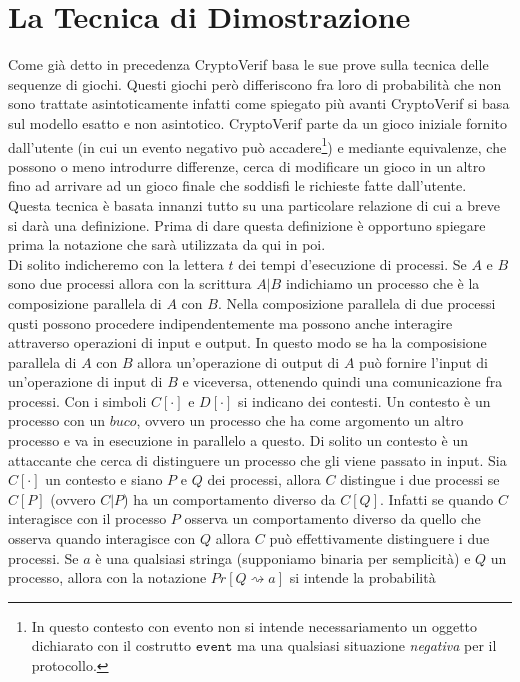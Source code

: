 \documentclass[a4paper,openright,twoside,12pt]{report}
\begin{document}
\section{La Tecnica di Dimostrazione}
Come gi\`a detto in precedenza CryptoVerif basa le sue prove sulla tecnica delle sequenze di giochi. Questi giochi per\`o differiscono fra loro
di probabilit\`a che non sono trattate asintoticamente infatti come spiegato pi\`u avanti CryptoVerif si basa sul modello esatto e non asintotico.
CryptoVerif parte da un gioco iniziale fornito dall'utente 
(in cui un evento negativo pu\`o accadere\footnote{In questo contesto con evento non si intende necessariamento un oggetto 
dichiarato con il costrutto $\texttt{event}$ ma una qualsiasi situazione \emph{negativa} per il protocollo.}) e mediante equivalenze, 
che possono o meno
introdurre differenze, cerca di modificare un gioco in un altro fino ad arrivare ad un gioco finale che soddisfi le richieste fatte dall'utente. Questa tecnica \`e basata innanzi tutto su una 
particolare relazione di cui a breve si dar\`a una definizione. Prima di dare questa definizione \`e opportuno spiegare prima la notazione che sar\`a utilizzata da qui in poi. \\Di solito indicheremo con la lettera $t$ dei tempi d'esecuzione di processi. 
Se $A$ e $B$ sono due processi allora con la scrittura $A|B$ indichiamo un processo che \`e la composizione parallela di $A$ con $B$. Nella composizione parallela di due processi qusti possono procedere indipendentemente ma possono
anche interagire attraverso operazioni di input e output. In questo modo se ha la composisione parallela di $A$ con $B$ allora un'operazione di output di $A$ pu\`o fornire l'input di un'operazione di input di $B$ e viceversa,
ottenendo quindi una comunicazione fra processi.
Con i simboli $C[\cdot]$ e $D[\cdot]$ si indicano dei contesti. 
Un contesto \`e un processo con un $buco$, ovvero un processo che ha come argomento un altro processo e va in esecuzione in parallelo a questo. Di solito un contesto \`e un attaccante che cerca di distinguere un processo che 
gli viene passato in input. Sia $C[\cdot]$ un contesto e siano $P$ e $Q$ dei processi, allora $C$ distingue i due processi se $C[P]$ (ovvero $C|P$) ha un comportamento diverso da $C[Q]$.
Infatti se quando $C$ interagisce con il processo $P$ osserva un comportamento diverso da quello che osserva quando interagisce con $Q$ allora $C$ pu\`o effettivamente distinguere i due processi.
Se $a$ \`e una qualsiasi stringa (supponiamo binaria per semplicit\`a) e $Q$ un processo, allora con la notazione $Pr[Q \rightsquigarrow a]$ si intende la probabilit\`a
\end{document}
